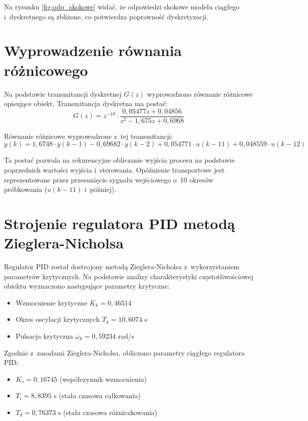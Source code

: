 \documentclass[a4paper,titlepage,11pt,floatssmall]{mwrep}
\begin{document}
Na rysunku \ref{fig:odp_skokowe} widać, że odpowiedzi skokowe modelu ciągłego i~dyskretnego są zbliżone, co potwierdza poprawność dyskretyzacji.

\section{Wyprowadzenie równania różnicowego}

Na podstawie transmitancji dyskretnej $G(z)$ wyprowadzono równanie różnicowe opisujące obiekt. Transmitancja dyskretna ma postać:
\begin{equation}
    G(z) = z^{-10} \cdot \frac{0,05477z + 0,04856}{z^2 - 1,675z + 0,6968}
\end{equation}

Równanie różnicowe wyprowadzone z~tej transmitancji:
\begin{equation}
    y(k) = 1,6748 \cdot y(k-1) - 0,69682 \cdot y(k-2) + 0,054771 \cdot u(k-11) + 0,048559 \cdot u(k-12)
\end{equation}

Ta postać pozwala na rekurencyjne obliczanie wyjścia procesu na podstawie poprzednich wartości wyjścia i~sterowania. Opóźnienie transportowe jest reprezentowane przez przesunięcie sygnału wejściowego o~10 okresów próbkowania ($u(k-11)$ i~później).

\section{Strojenie regulatora PID metodą Zieglera-Nicholsa}

Regulator PID został dostrojony metodą Zieglera-Nicholsa z~wykorzystaniem parametrów krytycznych. Na podstawie analizy charakterystyki częstotliwościowej obiektu wyznaczono następujące parametry krytyczne:
\begin{itemize}
    \item Wzmocnienie krytyczne $K_k = 0,46514$
    \item Okres oscylacji krytycznych $T_k = 10,6074$ s
    \item Pulsacja krytyczna $\omega_k = 0,59234$ rad/s
\end{itemize}

Zgodnie z~zasadami Zieglera-Nicholsa, obliczono parametry ciągłego regulatora PID:
\begin{itemize}
    \item $K_r = 0,16745$ (współczynnik wzmocnienia)
    \item $T_i = 8,8395$ s (stała czasowa całkowania)
    \item $T_d = 0,76373$ s (stała czasowa różniczkowania)
\end{itemize}
\end{document}
